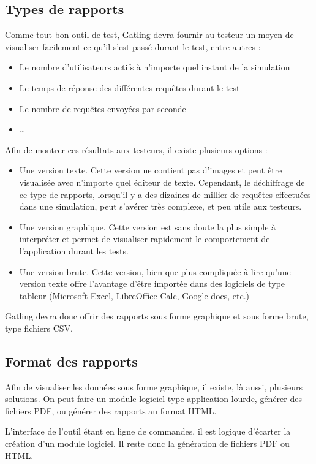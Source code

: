 \subsection{Types de rapports}

Comme tout bon outil de test, Gatling devra fournir au testeur un moyen de visualiser facilement ce qu'il s'est passé durant le test, entre autres :
\begin{itemize}
  \item Le nombre d'utilisateurs actifs à n'importe quel instant de la simulation
  \item Le temps de réponse des différentes requêtes durant le test
  \item Le nombre de requêtes envoyées par seconde
  \item \ldots
\end{itemize}

Afin de montrer ces résultats aux testeurs, il existe plusieurs options : 
\begin{itemize}
  \item Une version texte. Cette version ne contient pas d'images et peut être visualisée avec n'importe quel éditeur de texte. Cependant, le déchiffrage de ce type de rapports, lorsqu'il y a des dizaines de millier de requêtes effectuées dans une simulation, peut s'avérer très complexe, et peu utile aux testeurs.
  \item Une version graphique. Cette version est sans doute la plus simple à interpréter et permet de visualiser rapidement le comportement de l'application durant les tests.
  \item Une version brute. Cette version, bien que plus compliquée à lire qu'une version texte offre l'avantage d'être importée dans des logiciels de type tableur (Microsoft Excel, LibreOffice Calc, Google docs, etc.)
\end{itemize}

Gatling devra donc offrir des rapports sous forme graphique et sous forme brute, type fichiers CSV.

\subsection{Format des rapports}

Afin de visualiser les données sous forme graphique, il existe, là aussi, plusieurs solutions. On peut faire un module logiciel type application lourde, générer des fichiers PDF, ou générer des rapports au format HTML. 

L'interface de l'outil étant en ligne de commandes, il est logique d'écarter la création d'un module logiciel. Il reste donc la génération de fichiers PDF ou HTML.

